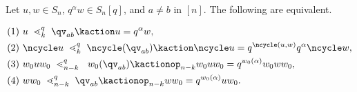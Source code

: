 \begin{corollary}\label{C:symmetries-q-ops}
  Let $u,w\in S_n$,  $q^\alpha w\in S_n[q]$, and $a\neq b$ in $[n]$.
  The following are equivalent.
  
  \begin{align*}
    & (1)\ u\ \lessdot_k^q\ \qv_{ab}\kaction u = q^\alpha w,\\
    & (2)\ \ncycle u\ \lessdot_k^q\ \ncycle(\qv_{ab})\kaction \ncycle u = q^{\ncycle(u,w)} q^\alpha \ncycle w,\\
    & (3)\ w_0uw_0\ \lessdot_{n-k}^q\ \ w_0(\qv_{ab})\kactionop_{n-k} w_0uw_0 =  q^{w_0(\alpha)} w_0 w w_0,\\
    & (4)\ w w_0\ \lessdot_{n-k}^q\ \qv_{ab}\kactionop_{n-k} ww_0 = q^{w_0(\alpha)} u w_0.
 \end{align*}
 
\end{corollary}

